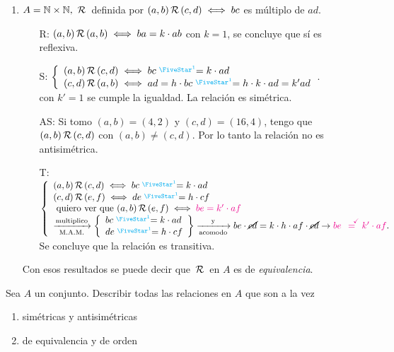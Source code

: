 \begin{enumerate}[label=\roman*)]
	\item $A = \mathbb N \times \mathbb N,\, \,\mathcal{R}\,$ definida por $(a,b) \,\mathcal{R}\, (c,d) \iff bc$ es múltiplo de $ad$.
	      \begin{enumerate}
		      \item[R:] $(a,b) \,\mathcal{R}\, (a,b) \iff ba = k\cdot ab$ con $k=1$, se concluye que sí es reflexiva.
		      \item[S:]
		            $ \llave{l}{
				            (a,b) \relacion (c,d) \sisolosi bc \llamada{1}= k\cdot ad \\
				            (c,d) \relacion (a,b) \sisolosi ad = h\cdot bc \llamada{1}= h\cdot k \cdot ad = k'ad
			            }$.\\
		            con  $k'=1$ se cumple la igualdad. La relación es simétrica.
		      \item[AS:] Si tomo $(a, b) = (4, 2)$ y $(c,d) = (16, 4)$, tengo que
		            $(a,b) \,\mathcal{R}\, (c,d)$ con $(a,b) \neq (c,d)$. Por lo tanto
		            la relación no es antisimétrica.
		      \item[T:]$
			            \llave{l}{
				            (a,b) \relacion (c,d) \sisolosi bc \llamada{1}= k\cdot ad \\
				            (c,d) \relacion (e,f) \sisolosi de \llamada{1}= h\cdot cf \\
				            \qvq (a,b) \relacion (e,f) \sisolosi \magenta{be = k'\cdot af}\\
				            \flecha{multiplico}[M.A.M.]
				            \llaves{l}
				            {
					            bc \llamada{1}= k\cdot ad \\
					            de \llamada{1}= h\cdot cf
				            } \flecha{y}[acomodo]
				            be \cdot \cancel{cd} = k \cdot h \cdot af \cdot \cancel{cd} \to
				            \magenta{be \stackrel{\Tilde}= k' \cdot af}.
			            }$\\
		            Se concluye que la relación es transitiva.
	      \end{enumerate}
	      Con esos resultados se puede decir que $\,\mathcal{R}\,$ en $A$ es de \textit{equivalencia}.

\end{enumerate}
\ejercicio
Sea $A$ un conjunto. Describir todas las relaciones en $A$ que son a la vez
\begin{multicols}{2}
	\begin{enumerate}[label=\roman*)]
		\item simétricas y antisimétricas\\ 
		\item de equivalencia y de orden\\ 
	\end{enumerate}
\end{multicols}

